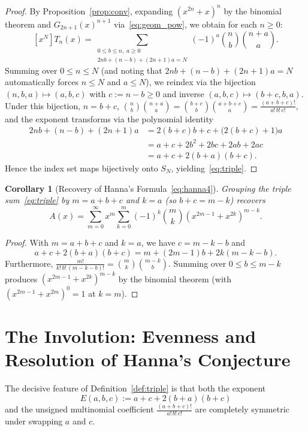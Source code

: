 \documentclass[11pt,a4paper]{article}
\newtheorem{corollary}[theorem]{Corollary}
\theoremstyle{definition}
\theoremstyle{remark}
\newcommand{\coeff}[1]{[x^{#1}]}
\begin{document}
\begin{proof}
By Proposition~\ref{prop:conv}, expanding $(x^{2n}+x)^n$ by the binomial theorem and $G_{2n+1}(x)^{n+1}$ via~\eqref{eq:geom_pow}, we obtain for each $n \ge 0$:
\[
\coeff{N} T_n(x)
= \sum_{\substack{0 \le b \le n,\; a \ge 0 \\ 2nb + (n-b) + (2n+1)a = N}}
  (-1)^a \binom{n}{b} \binom{n+a}{a}.
\]
Summing over $0 \le n \le N$ (and noting that $2nb + (n-b) + (2n+1)a = N$ automatically forces $n \le N$ and $a \le N$), we reindex via the bijection $(n, b, a) \mapsto (a, b, c)$ with $c := n - b \ge 0$ and inverse $(a, b, c) \mapsto (b+c, b, a)$. Under this bijection, $n = b+c$, $\binom{n}{b}\binom{n+a}{a} = \binom{b+c}{b}\binom{a+b+c}{a} = \frac{(a+b+c)!}{a!\,b!\,c!}$, and the exponent transforms via the polynomial identity
\begin{align*}
2nb + (n-b) + (2n+1)a
&= 2(b+c)b + c + \bigl(2(b+c)+1\bigr)a \\
&= a + c + 2b^2 + 2bc + 2ab + 2ac \\
&= a + c + 2(b+a)(b+c).
\end{align*}
Hence the index set maps bijectively onto $S_N$, yielding~\eqref{eq:triple}.
\end{proof}

\begin{corollary}[Recovery of Hanna's Formula~\eqref{eq:hanna4}]\label{cor:formula4}
Grouping the triple sum~\eqref{eq:triple} by $m = a+b+c$ and $k = a$ (so $b + c = m - k$) recovers
\[
A(x) = \sum_{m=0}^{\infty} x^m \sum_{k=0}^{m} (-1)^k \binom{m}{k} (x^{2m-1} + x^{2k})^{m-k}.
\]
\end{corollary}

\begin{proof}
With $m = a+b+c$ and $k = a$, we have $c = m - k - b$ and
\[
a + c + 2(b+a)(b+c)
= m + (2m-1)b + 2k(m-k-b).
\]
Furthermore, $\frac{m!}{k!\,b!\,(m-k-b)!} = \binom{m}{k}\binom{m-k}{b}$. Summing over $0 \le b \le m-k$ produces $(x^{2m-1} + x^{2k})^{m-k}$ by the binomial theorem (with $(x^{2m-1} + x^{2m})^0 = 1$ at $k = m$).
\end{proof}

\section{The Involution: Evenness and Resolution of Hanna's Conjecture}

The decisive feature of Definition~\ref{def:triple} is that both the exponent
\[
E(a,b,c) := a + c + 2(b+a)(b+c)
\]
and the unsigned multinomial coefficient $\frac{(a+b+c)!}{a!\,b!\,c!}$ are completely symmetric under swapping $a$ and $c$.
\end{document}
